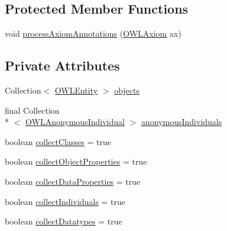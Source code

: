 \subsection*{Protected Member Functions}
\begin{DoxyCompactItemize}
\item 
void \hyperlink{classorg_1_1semanticweb_1_1owlapi_1_1util_1_1_o_w_l_entity_collector_a2065c35845622387936244a4da9a8811}{process\-Axiom\-Annotations} (\hyperlink{interfaceorg_1_1semanticweb_1_1owlapi_1_1model_1_1_o_w_l_axiom}{O\-W\-L\-Axiom} ax)
\end{DoxyCompactItemize}
\subsection*{Private Attributes}
\begin{DoxyCompactItemize}
\item 
Collection$<$ \hyperlink{interfaceorg_1_1semanticweb_1_1owlapi_1_1model_1_1_o_w_l_entity}{O\-W\-L\-Entity} $>$ \hyperlink{classorg_1_1semanticweb_1_1owlapi_1_1util_1_1_o_w_l_entity_collector_a5c1c8d0a8249cb35b0b4970d537c3e70}{objects}
\item 
final Collection\\*
$<$ \hyperlink{interfaceorg_1_1semanticweb_1_1owlapi_1_1model_1_1_o_w_l_anonymous_individual}{O\-W\-L\-Anonymous\-Individual} $>$ \hyperlink{classorg_1_1semanticweb_1_1owlapi_1_1util_1_1_o_w_l_entity_collector_a76328e06238ff8225ae9ef8065a34f1c}{anonymous\-Individuals}
\item 
boolean \hyperlink{classorg_1_1semanticweb_1_1owlapi_1_1util_1_1_o_w_l_entity_collector_a056751a74d0026a193c89811dfdf839e}{collect\-Classes} = true
\item 
boolean \hyperlink{classorg_1_1semanticweb_1_1owlapi_1_1util_1_1_o_w_l_entity_collector_aea2013525169eee594310ca8c8c54bfe}{collect\-Object\-Properties} = true
\item 
boolean \hyperlink{classorg_1_1semanticweb_1_1owlapi_1_1util_1_1_o_w_l_entity_collector_a3168775eb686ad3b230f66e8831a67c8}{collect\-Data\-Properties} = true
\item 
boolean \hyperlink{classorg_1_1semanticweb_1_1owlapi_1_1util_1_1_o_w_l_entity_collector_a592d28f3b1ab23fa3fd4cec9462fb7f6}{collect\-Individuals} = true
\item 
boolean \hyperlink{classorg_1_1semanticweb_1_1owlapi_1_1util_1_1_o_w_l_entity_collector_a9b2041e98bb3efd4e3970c3ff5b02d23}{collect\-Datatypes} = true
\end{DoxyCompactItemize}
